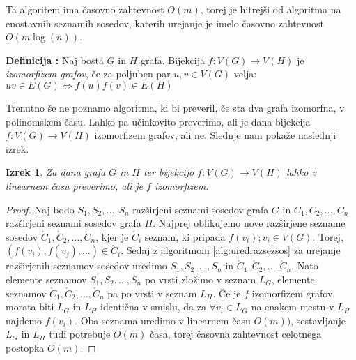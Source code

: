 \documentclass[a4paper, 10pt]{article}
\newtheorem{izr}{Izrek}
\newcounter{defcount}
\newenvironment{definicija}{\begin{flushleft}\stepcounter{defcount}\textbf{Definicija \arabic{defcount}:}}{\hfill\end{flushleft}}
\newcommand{\pojem}[1]{\emph{#1}}
\newcommand{\map}[3]{\ensuremath{{#1}: {#2} \rightarrow {#3}}}
\begin{document}
		Ta algoritem ima časovno zahtevnost $O(m)$, torej je hitrejši od algoritma na enostavnih seznamih sosedov, katerih urejanje je imelo časovno zahtevnost $O(m\log(n))$.
	\begin{definicija}
		Naj bosta $G$ in $H$ grafa. Bijekcija $\map{f}{V(G)}{V(H)}$ je \pojem{izomorfizem grafov}, če za poljuben par $u, v\in V(G)$ velja: $uv\in E(G) \iff f(u)f(v)\in E(H)$
	\end{definicija}
	Trenutno še ne poznamo algoritma, ki bi preveril, če sta dva grafa izomorfna, v polinomskem času. Lahko pa učinkovito preverimo, ali je dana bijekcija $\map{f}{V(G)}{V(H)}$ izomorfizem grafov, ali ne. Slednje nam pokaže naslednji izrek.
	\begin{izr}
		Za dana grafa $G$ in $H$ ter bijekcijo $\map{f}{V(G)}{V(H)}$ lahko v linearnem času preverimo, ali je $f$ izomorfizem.
	\end{izr}
	\begin{proof}
		Naj bodo $S_1, S_2, \ldots, S_n$ razširjeni seznami sosedov grafa $G$ in $C_1, C_2, \ldots, C_n$ razširjeni seznami sosedov grafa $H$. Najprej oblikujemo nove razširjene sezname sosedov $\acute{C}_1, \acute{C}_2, \ldots, \acute{C}_n$, kjer je $\acute{C}_i$ seznam, ki pripada $f(v_i); v_i\in V(G)$. Torej, $(f(v_i), f(v_j), \ldots)\in \acute{C}_i$.
		Sedaj z algoritmom \ref{alg:uredrazsezsos} za urejanje razširjenih seznamov sosedov uredimo $S_1, S_2, \ldots, S_n$ in $\acute{C}_1, \acute{C}_2, \ldots, \acute{C}_n$. Nato elemente seznamov $S_1, S_2, \ldots, S_n$ po vrsti zložimo v seznam $L_G$, elemente seznamov $\acute{C}_1, \acute{C}_2, \ldots, \acute{C}_n$ pa po vrsti v seznam $L_H$. Če je $f$ izomorfizem grafov, morata biti $L_G$ in $L_H$ identična v smislu, da za $\forall v_i \in L_G$ na enakem mestu v $L_H$ najdemo $f(v_i)$. Oba seznama uredimo v linearnem času $O(m))$, sestavljanje $L_G$ in $L_H$ tudi potrebuje $O(m)$ časa, torej časovna zahtevnost celotnega postopka $O(m)$.
	\end{proof}
\end{document}
